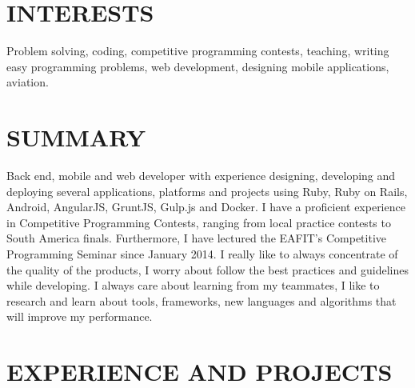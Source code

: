 \documentclass[margin, 10pt]{res} %
\begin{document}
\begin{resume}


\section{INTERESTS}

Problem solving, coding, competitive programming contests, teaching, writing easy programming
problems, web development, designing mobile applications, aviation.


\section{SUMMARY}

Back end, mobile and web developer with experience designing, developing and deploying several
applications, platforms and projects using Ruby, Ruby on Rails, Android, AngularJS, GruntJS, Gulp.js
and Docker. I have a proficient experience in Competitive Programming Contests, ranging from local
practice contests to South America finals. Furthermore, I have lectured the EAFIT's Competitive
Programming Seminar since January 2014. I really like to always concentrate of the quality of the
products, I worry about follow the best practices and guidelines while developing. I always care
about learning from my teammates, I like to research and learn about tools, frameworks, new
languages and algorithms that will improve my performance.


\section{EXPERIENCE AND PROJECTS}


\end{resume}
\end{document}
